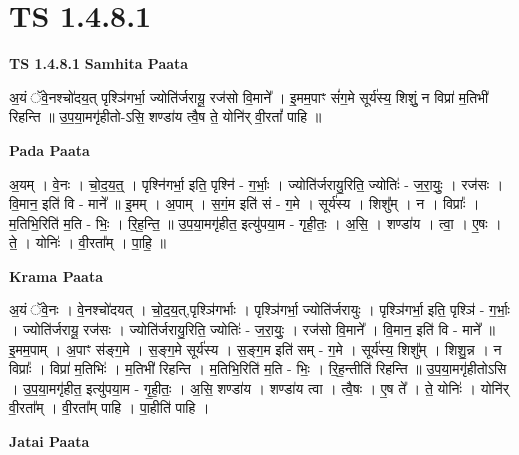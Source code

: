 \documentclass[17pt]{extarticle}
\begin{document}
\section*{ TS 1.4.8.1 }

\textbf{TS 1.4.8.1 } \newline
\textbf{Samhita Paata} \newline

अ॒यं ॅवे॒नश्चो॑दय॒त् पृश्ञि॑गर्भा॒ ज्योति॑र्जरायू॒ रज॑सो वि॒माने᳚ । इ॒मम॒पाꣳ सं॑ग॒मे सूर्य॑स्य॒ शिशुं॒ न विप्रा॑ म॒तिभी॑ रिहन्ति ॥ उ॒प॒या॒मगृ॑हीतो-ऽसि॒ शण्डा॑य त्वै॒ष ते॒ योनि॑र् वी॒रतां᳚ पाहि ॥ \newline

\textbf{Pada Paata} \newline

अ॒यम् । वे॒नः । चो॒द॒य॒त्॒ । पृश्नि॑गर्भा॒ इति॒ पृश्नि॑ - ग॒र्भाः॒ । ज्योति॑र्जरायु॒रिति॒ ज्योतिः॑ - ज॒रा॒युः॒ । रज॑सः । वि॒मान॒ इति॑ वि - माने᳚ ॥ इ॒मम् । अ॒पाम् । स॒गं॒म इति॑ सं - ग॒मे । सूर्य॑स्य । शिशु᳚म् । न । विप्राः᳚ । म॒तिभि॒रिति॑ म॒ति - भिः॒ । रि॒ह॒न्ति॒ ॥ उ॒प॒या॒मगृ॑हीत॒ इत्यु॑पया॒म - गृही॒तः॒ । अ॒सि॒ । शण्डा॑य । त्वा॒ । ए॒षः । ते॒ । योनिः॑ । वी॒रता᳚म् । पा॒हि॒ ॥  \newline


\textbf{Krama Paata} \newline

अ॒यं ॅवे॒नः । वे॒नश्चो॑दयत् । चो॒द॒य॒त्,पृश्ञि॑गर्भाः । पृश्ञि॑गर्भा॒ ज्योति॑र्जरायुः । पृश्ञि॑गर्भा॒ इति॒ पृश्ञि॑ - ग॒र्भाः॒ । ज्योति॑र्जरायू॒ रज॑सः । ज्योति॑र्जरायु॒रिति॒ ज्योतिः॑ - ज॒रा॒युः॒ । रज॑सो वि॒माने᳚ । वि॒मान॒ इति॑ वि - माने᳚ ॥ इ॒मम॒पाम् । अ॒पाꣳ स॑ङ्ग॒मे । स॒ङ्ग॒मे सूर्य॑स्य । स॒ङ्ग॒म इति॑ सम् - ग॒मे । सूर्य॑स्य॒ शिशु᳚म् । शिशु॒न्न । न विप्राः᳚ । विप्रा॑ म॒तिभिः॑ । म॒तिभी॑ रिहन्ति । म॒तिभि॒रिति॑ म॒ति - भिः॒ । रि॒ह॒न्तीति॑ रिहन्ति ॥ उ॒प॒या॒मगृ॑हीतोऽसि । उ॒प॒या॒मगृ॑हीत॒ इत्यु॑पया॒म - गृ॒ही॒तः॒ । अ॒सि॒ शण्डा॑य । शण्डा॑य त्वा । त्वै॒षः । ए॒ष ते᳚ । ते॒ योनिः॑ । योनि॑र् वी॒रता᳚म् । वी॒रता᳚म् पाहि । पा॒हीति॑ पाहि । \newline

\textbf{Jatai Paata} \newline
\end{document}
